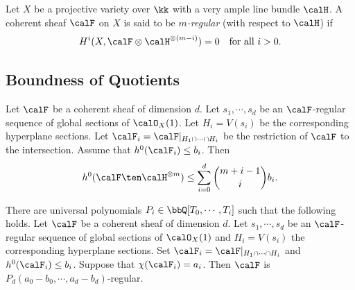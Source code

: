 
    \begin{definition}\label{def:m-regular_of_coherent_sheaves}
        Let \(X\) be a projective variety over \(\kk\) with a very ample line bundle \(\calH\).
        A coherent sheaf \(\calF\) on \(X\) is said to be \emph{\(m\)-regular} (with respect to \(\calH\)) if
        \[H^i(X, \calF\otimes \calH^{\otimes (m-i)}) = 0 \quad \text{for all } i > 0.\]
    \end{definition}

\subsection{Boundness of Quotients}

    \begin{lemma}\label{lem}
        Let \(\calF\) be a coherent sheaf of dimension \(d\). 
        Let \(s_1,\cdots,s_d\) be an \(\calF\)-regular sequence of global sections of \(\calO_X(1)\).
        Let \(H_i = V(s_i)\) be the corresponding hyperplane sections.
        Let \(\calF_i = \calF|_{H_1\cap \cdots \cap H_i}\) be the restriction of \(\calF\) to the intersection.
        Assume that \(h^0(\calF_i)\leq b_i\).
        Then 
        \[ h^0(\calF \ten \calH^{\otimes m}) \leq \sum_{i=0}^d \binom{m+i-1}{i} b_i. \]
    \end{lemma}

    \begin{proposition}
        There are universal polynomials \(P_i \in \bbQ[T_0,\cdots,T_i]\) such that the following holds.
        Let \(\calF\) be a coherent sheaf of dimension \(d\).
        Let \(s_1,\cdots,s_d\) be an \(\calF\)-regular sequence of global sections of \(\calO_X(1)\) and \(H_i = V(s_i)\) the corresponding hyperplane sections.
        Set \(\calF_i = \calF|_{H_1\cap \cdots \cap H_i}\) and \(h^0(\calF_i) \leq b_i\).
        Suppose that \(\chi(\calF_i) = a_i\).
        Then \(\calF\) is \(P_d(a_0-b_0,\cdots,a_d-b_d)\)-regular.
    \end{proposition}

